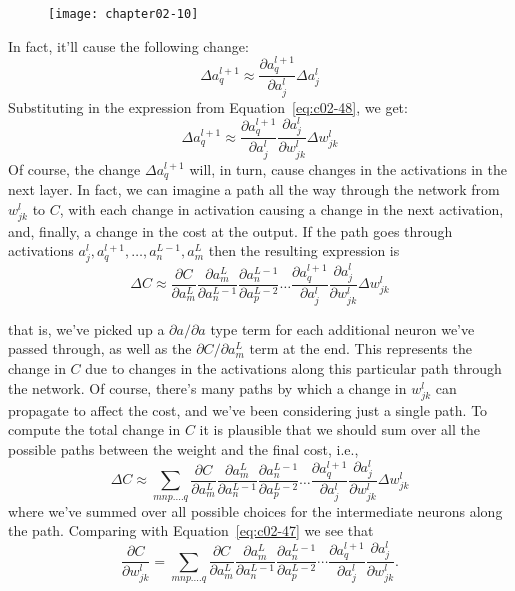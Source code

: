 \begin{figure}
\texttt{[image: chapter02-10]}
\end{figure}

In fact, it'll cause the following change: 
\begin{equation}
\Delta a_{q}^{l+1} \approx \frac{\partial a_{q}^{l+1}}{\partial a_{j}^{l}} \Delta a_{j}^{l}
\label{eq:c02-49}
\end{equation}
Substituting in the expression from Equation~\ref{eq:c02-48}, we get: 
\begin{equation}
\Delta a_{q}^{l+1} \approx \frac{\partial a_{q}^{l+1}}{\partial a_{j}^{l}} \frac{\partial a_{j}^{l}}{\partial w_{j k}^{l}} \Delta w_{j k}^{l}
\label{eq:c02-50}
\end{equation}
Of course, the change $\Delta a^{l+1}_q$ will, in turn, cause changes in the activations in the next layer. In fact, we can imagine a path all the way through the network from $w^l_{jk}$ to $C$, with each change in activation causing a change in the next activation, and, finally, a change in the cost at the output. If the path goes through activations $a_{j}^{l}, a_{q}^{l+1}, \ldots, a_{n}^{L-1}, a_{m}^{L}$ then the resulting expression is 
\begin{equation}
\Delta C \approx \frac{\partial C}{\partial a_{m}^{L}} \frac{\partial a_{m}^{L}}{\partial a_{n}^{L-1}} \frac{\partial a_{n}^{L-1}}{\partial a_{p}^{L-2}} \ldots \frac{\partial a_{q}^{l+1}}{\partial a_{j}^{l}} \frac{\partial a_{j}^{l}}{\partial w_{j k}^{l}} \Delta w_{j k}^{l}
\label{eq:c02-51}
\end{equation}


that is, we've picked up a $\partial a/\partial a$ type term for each additional neuron we've passed through, as well as the $\partial C / \partial a_{m}^{L}$ term at the end. This represents the change in $C$ due to changes in the activations along this particular path through the network. Of course, there's many paths by which a change in $w^l_{jk}$ can propagate to affect the cost, and we've been considering just a single path. To compute the total change in $C$ it is plausible that we should sum over all the possible paths between the weight and the final cost, i.e., 
\begin{equation}
\Delta C \approx \sum_{m n p . \ldots q} \frac{\partial C}{\partial a_{m}^{L}} \frac{\partial a_{m}^{L}}{\partial a_{n}^{L-1}} \frac{\partial a_{n}^{L-1}}{\partial a_{p}^{L-2}} \ldots \frac{\partial a_{q}^{l+1}}{\partial a_{j}^{l}} \frac{\partial a_{j}^{l}}{\partial w_{j k}^{l}} \Delta w_{j k}^{l}
\label{eq:c02-52}
\end{equation}
where we've summed over all possible choices for the intermediate neurons along the path. Comparing with Equation~\ref{eq:c02-47} we see that 
\begin{equation}
\frac{\partial C}{\partial w_{j k}^{l}}=\sum_{m n p . \ldots q} \frac{\partial C}{\partial a_{m}^{L}} \frac{\partial a_{m}^{L}}{\partial a_{n}^{L-1}} \frac{\partial a_{n}^{L-1}}{\partial a_{p}^{L-2}} \cdots \frac{\partial a_{q}^{l+1}}{\partial a_{j}^{l}} \frac{\partial a_{j}^{l}}{\partial w_{j k}^{l}}.
\label{eq:c02-53}
\end{equation}

